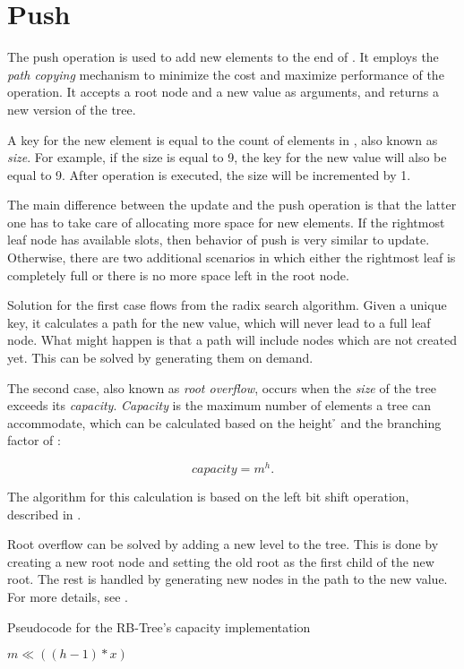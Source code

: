 \section{Push} 
The push operation is used to add new elements to the end of \rbtree{}. It employs the \emph{path copying} mechanism to minimize the cost and maximize performance of the operation. It accepts a root node and a new value as arguments, and returns a new version of the tree. 

A key for the new element is equal to the count of elements in \rbtree{}, also known as \emph{size}. For example, if the size is equal to 9, the key for the new value will also be equal to 9. After operation is executed, the size will be incremented by 1. 

The main difference between the update and the push operation is that the latter one has to take care of allocating more space for new elements. If the rightmost leaf node has available slots, then behavior of push is very similar to update. Otherwise, there are two additional scenarios in which either the rightmost leaf is completely full or there is no more space left in the root node. 

Solution for the first case flows from the radix search algorithm. Given a unique key, it calculates a path for the new value, which will never lead to a full leaf node. What might happen is that a path will include nodes which are not created yet. This can be solved by generating them on demand. 

The second case, also known as \emph{root overflow}, occurs when the \emph{size} of the tree exceeds its \emph{capacity}. \emph{Capacity} is the maximum number of elements a tree can accommodate, which can be calculated based on the height \h{} and the branching factor \m{} of \rbtree{}:

\begin{equation}
	capacity = m^h.
\end{equation}

The algorithm for this calculation is based on the left bit shift operation, described in . 

Root overflow can be solved by adding a new level to the tree. This is done by creating a new root node and setting the old root as the first child of the new root. The rest is handled by generating new nodes in the path to the new value. For more details, see . 

\begin{listing}[ht!]        
    \caption{Pseudocode for the RB-Tree's capacity implementation}
    \label{lst:rb-tree-capacity}
    
    \begin{algorithmic}
		\State \Return $m \ll ((h - 1) * x)$
        \EndFunction
    \end{algorithmic}
\end{listing}

